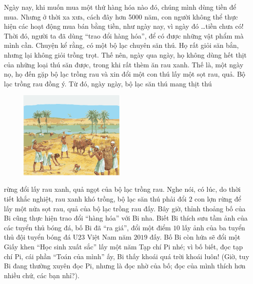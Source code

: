 	Ngày nay, khi muốn mua một thứ hàng hóa nào đó, chúng mình dùng tiền để mua. Nhưng ở thời xa xưa, cách đây hơn 5000 năm, con người không thể thực hiện các hoạt động mua bán bằng tiền, như ngày nay, vì ngày đó \ldots tiền chưa có! Thời đó, người ta đã dùng “trao đổi hàng hóa”, để có được những vật phẩm mà mình cần. Chuyện kể rằng, có một bộ lạc chuyên săn thú. Họ rất giỏi săn bắn, nhưng lại không giỏi trồng trọt. Thế nên, ngày qua ngày, họ không dùng hết thịt của những loại thú săn được, trong khi rất thèm ăn rau xanh. Thế là, một ngày nọ, họ đến gặp bộ lạc trồng rau và xin đổi một con thú lấy một sọt rau, quả. Bộ lạc trồng rau đồng ý. Từ đó, ngày ngày, bộ lạc săn thú mang thịt thú
	\begin{figure}[H]
		\centering
		\vspace*{-5pt}
		\captionsetup{labelformat= empty, justification=centering}
		\includegraphics[width=0.47\textwidth]{pic2}
		\vspace*{-10pt}
	\end{figure}
	rừng đổi lấy rau xanh, quả ngọt của bộ lạc trồng rau. Nghe nói, có lúc, do thời tiết khắc nghiệt, rau xanh khó trồng, bộ lạc săn thú phải đổi $2$ con lợn rừng để lấy một nửa sọt rau, quả của bộ lạc trồng rau đấy.
	\vskip 0.15cm	
	Bây giờ, thỉnh thoảng bố của Bi cũng thực hiện trao đổi “hàng hóa” với Bi nha. Biết Bi thích sưu tầm ảnh của các tuyển thủ bóng đá, bố Bi đã “ra giá”, đổi một điểm $10$ lấy ảnh của ba tuyển thủ đội tuyển bóng đá U$23$ Việt Nam năm $2019$ đấy. Bố Bi còn hứa sẽ đổi một Giấy khen “Học sinh xuất sắc” lấy một năm Tạp chí Pi nhé; vì bố biết, đọc tạp chí Pi, cái phần “Toán của  mình” ấy, Bi thấy khoái quá trời khoái luôn! (Giờ, tuy Bi đang thường xuyên đọc Pi, nhưng là đọc nhờ của bố; đọc của mình thích hơn nhiều chứ, các bạn nhỉ?).
